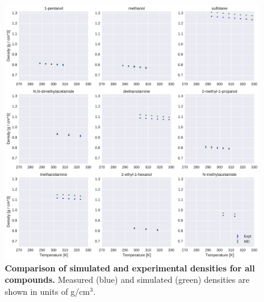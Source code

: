 \documentclass[journal=jacsat,manuscript=article]{achemso}
\begin{document}
\begin{figure}[alldensity]

\ContinuedFloat

\includegraphics[width=\textwidth]{./figures/densities_versus_temperature_part2.pdf}

\caption{{\bf Comparison of simulated and experimental densities for all compounds.} 
Measured (blue) and simulated (green) densities are shown in units of g/cm$^{3}$.
\label{figure:AllDensities}
}

\end{figure}
\end{document}

